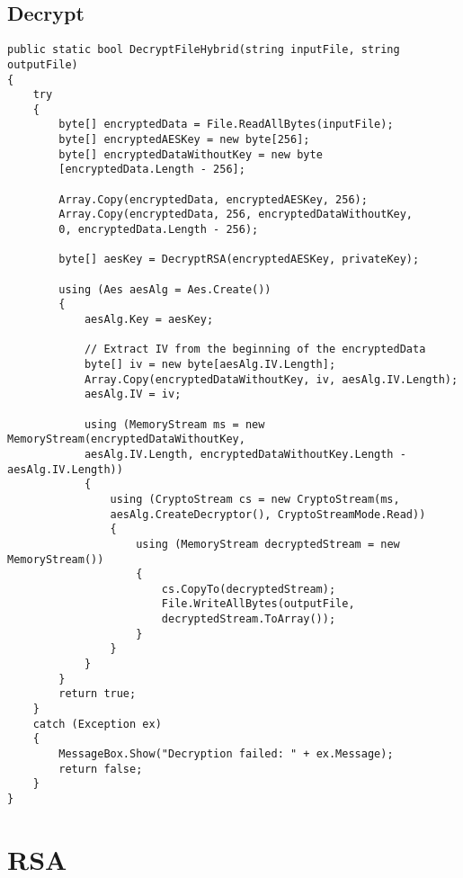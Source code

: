 \documentclass[a4paper,oneside,11pt]{book}
\begin{document}
\section{Decrypt}
\begin{lstlisting}[language=Csh, caption={Endpoint to delete FITS file}]
public static bool DecryptFileHybrid(string inputFile, string outputFile)
{
    try
    {
        byte[] encryptedData = File.ReadAllBytes(inputFile);
        byte[] encryptedAESKey = new byte[256];
        byte[] encryptedDataWithoutKey = new byte
        [encryptedData.Length - 256];
    
        Array.Copy(encryptedData, encryptedAESKey, 256);
        Array.Copy(encryptedData, 256, encryptedDataWithoutKey, 
        0, encryptedData.Length - 256);
    
        byte[] aesKey = DecryptRSA(encryptedAESKey, privateKey);
    
        using (Aes aesAlg = Aes.Create())
        {
            aesAlg.Key = aesKey;
    
            // Extract IV from the beginning of the encryptedData
            byte[] iv = new byte[aesAlg.IV.Length];
            Array.Copy(encryptedDataWithoutKey, iv, aesAlg.IV.Length);
            aesAlg.IV = iv;
    
            using (MemoryStream ms = new MemoryStream(encryptedDataWithoutKey, 
            aesAlg.IV.Length, encryptedDataWithoutKey.Length - aesAlg.IV.Length))
            {
                using (CryptoStream cs = new CryptoStream(ms, 
                aesAlg.CreateDecryptor(), CryptoStreamMode.Read))
                {
                    using (MemoryStream decryptedStream = new MemoryStream())
                    {
                        cs.CopyTo(decryptedStream);
                        File.WriteAllBytes(outputFile, 
                        decryptedStream.ToArray());
                    }
                }
            }
        }
        return true;
    }
    catch (Exception ex)
    {
        MessageBox.Show("Decryption failed: " + ex.Message);
        return false;
    }
}
\end{lstlisting}
\chapter[RSA]{RSA}
\end{document}
